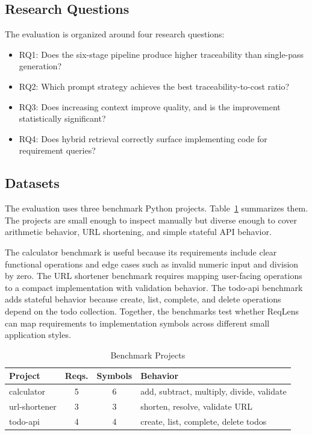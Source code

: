 \documentclass[conference]{IEEEtran}
\begin{document}
\subsection{Research Questions}
The evaluation is organized around four research questions:
\begin{itemize}
\item RQ1: Does the six-stage pipeline produce higher traceability than
single-pass generation?
\item RQ2: Which prompt strategy achieves the best traceability-to-cost ratio?
\item RQ3: Does increasing context improve quality, and is the improvement
statistically significant?
\item RQ4: Does hybrid retrieval correctly surface implementing code for
requirement queries?
\end{itemize}

\subsection{Datasets}
The evaluation uses three benchmark Python projects. Table~\ref{tab:benchmarks}
summarizes them. The projects are small enough to inspect manually but diverse
enough to cover arithmetic behavior, URL shortening, and simple stateful API
behavior.

The calculator benchmark is useful because its requirements include clear
functional operations and edge cases such as invalid numeric input and division
by zero. The URL shortener benchmark requires mapping user-facing operations to
a compact implementation with validation behavior. The todo-api benchmark adds
stateful behavior because create, list, complete, and delete operations depend
on the todo collection. Together, the benchmarks test whether ReqLens can map
requirements to implementation symbols across different small application
styles.

\begin{table}[htbp]
\caption{Benchmark Projects}
\begin{center}
\begin{tabular}{|p{}|c|c|p{}|}
\hline
\textbf{Project} & \textbf{Reqs.} & \textbf{Symbols} & \textbf{Behavior} \\
\hline
calculator & 5 & 6 & add, subtract, multiply, divide, validate \\
\hline
url-shortener & 3 & 3 & shorten, resolve, validate URL \\
\hline
todo-api & 4 & 4 & create, list, complete, delete todos \\
\hline
\end{tabular}
\label{tab:benchmarks}
\end{center}
\end{table}
\end{document}
